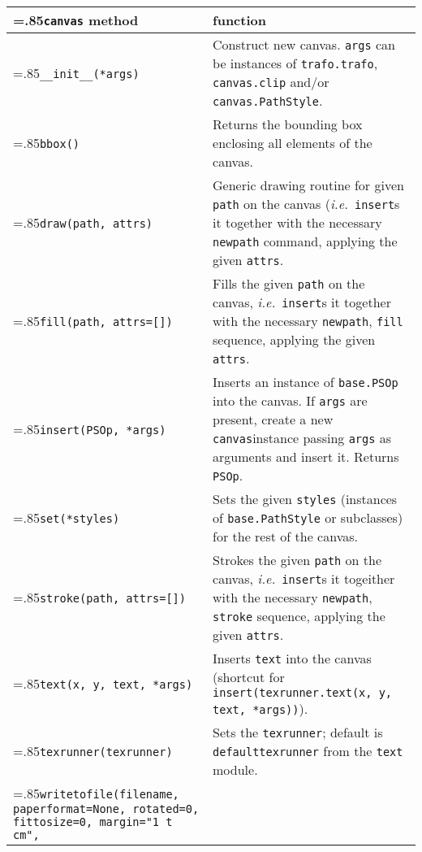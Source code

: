 \medskip
\begin{tabularx}
  {\linewidth}
  {>{\hsize=.85\hsize}X>{\raggedright\arraybackslash\hsize=1.15\hsize}X}
  \texttt{canvas} method & function \\
  \hline
  \texttt{\_\_init\_\_(*args)} & Construct new canvas. \texttt{args}
  can be instances of \texttt{trafo.trafo}, \texttt{canvas.clip}
  and/or \texttt{canvas.PathStyle}.\\
  \texttt{bbox()} &
  Returns the bounding box enclosing all elements of the canvas.\\
  \texttt{draw(path, attrs)} &
  Generic drawing routine for given \texttt{path} on the canvas (\textit{i.e.}\
  \texttt{insert}s it together with the necessary \texttt{newpath}
  command, applying the given \texttt{attrs}. \\
  \texttt{fill(path, attrs=[])} &
  Fills the given \texttt{path} on the canvas, \textit{i.e.}\
  \texttt{insert}s it together with the necessary \texttt{newpath},
  \texttt{fill} sequence, applying the given \texttt{attrs}. \\
  \texttt{insert(PSOp, *args)} &
  Inserts an instance of \texttt{base.PSOp} into the canvas.
  If \texttt{args} are present, create a new \texttt{canvas}instance passing
  \texttt{args} as arguments and insert it. Returns \texttt{PSOp}.\\
  \texttt{set(*styles)} &
  Sets the given \texttt{styles} (instances of \texttt{base.PathStyle} or
  subclasses) for the rest of the canvas.\\
  \texttt{stroke(path, attrs=[])} & 
  Strokes the given \texttt{path} on the canvas, \textit{i.e.}\
  \texttt{insert}s it togeither with the necessary \texttt{newpath},
  \texttt{stroke} sequence, applying the given \texttt{attrs}. \\
  \texttt{text(x, y, text, *args)} &
  Inserts \texttt{text} into the
  canvas (shortcut for
  \texttt{insert(texrunner.text(x, y, text, *args))}).\\
  \texttt{texrunner(texrunner)} &
  Sets the \texttt{texrunner}; default is \texttt{defaulttexrunner}
  from the \texttt{text} module.\\
    \texttt{writetofile(filename, 
      \newline\phantom{writetofile(}paperformat=None, 
      \newline\phantom{writetofile(}rotated=0,
      \newline\phantom{writetofile(}fittosize=0, 
      \newline\phantom{writetofile(}margin="1 t cm",
}
\end{tabularx}
